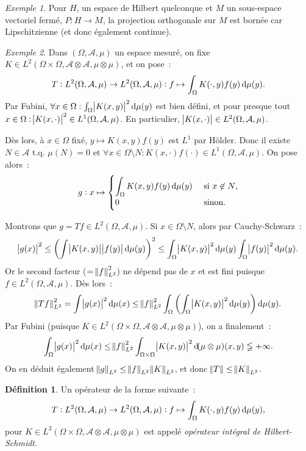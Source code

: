 \documentclass{report}
\newcommand{\tq}{\text{ t.q. }}
\newcommand{\st}{\tq}
\newcommand{\pinfty}{{+\infty}}
\theoremstyle{definition}
\newtheorem{déf}[thm]{Définition}
\theoremstyle{remark}
\newtheorem{ex}{Exemple}[chapter]
\begin{document}
\begin{ex}
Pour $H$, un espace de Hilbert quelconque et $M$ un sous-espace vectoriel fermé, $P : H \to M$, la projection orthogonale sur $M$ est bornée car Lipschitzienne
(et donc également continue).
\end{ex}

\begin{ex}
Dans $(\Omega, \mathcal A, \mu)$ un espace mesuré, on fixe $K \in L^2(\Omega \times \Omega, \mathcal A \otimes \mathcal A, \mu \otimes \mu)$, et on pose~:
\[T : L^2(\Omega, \mathcal A, \mu) \to L^2(\Omega, \mathcal A, \mu) : f \mapsto \int_\Omega K(\cdot, y)f(y)\dif\mu(y).\]
Par Fubini, $\forall x \in \Omega : \int_\Omega \abs {K(x, y)}^2\dif\mu(y)$ est bien défini, et pour presque tout $x \in \Omega :
\abs {K(x, \cdot)}^2 \in L^1(\Omega, \mathcal A, \mu)$. En particulier, $\abs {K(x, \cdot)} \in L^2(\Omega, \mathcal A, \mu)$.

Dès lors, à $x \in \Omega$ fixé, $y \mapsto K(x, y)f(y)$ est $L^1$ par Hölder. Donc il existe $N \in \mathcal A \st \mu(N) = 0$ et $\forall x \in \Omega \setminus N :
K(x, \cdot)f(\cdot) \in L^1(\Omega, \mathcal A, \mu)$. On pose alors~:
\[g : x \mapsto \begin{cases}\displaystyle \int_\Omega K(x, y)f(y)\dif\mu(y) &\text{ si $x \not \in N$,} \\0 &\text{ sinon.}\end{cases}\]

Montrons que $g = Tf \in L^2(\Omega, \mathcal A, \mu)$. Si $x \in \Omega \setminus N$, alors par Cauchy-Schwarz~:
\[\abs {g(x)}^2 \leq \left(\int\abs {K(x, y)}\abs {f(y)}\dif\mu(y)\right)^2 \leq \int_\Omega \abs {K(x, y)}^2\dif\mu(y)\int_\Omega \abs {f(y)}^2\dif\mu(y).\]
Or le second facteur ($= \norm f_{L^2}^2$) ne dépend pas de $x$ et est fini puisque $f \in L^2(\Omega, \mathcal A, \mu)$. Dès lors~:
\[\norm {Tf}_{L^2}^2 = \int\abs {g(x)}^2\dif\mu(x) \leq \norm f_{L^2}^2\int_\Omega\left(\int_\Omega \abs {K(x, y)}^2\dif\mu(y)\right)\dif\mu(y).\]
	Par Fubini (puisque $K \in L^2(\Omega \times \Omega, \mathcal A \otimes \mathcal A, \mu \otimes \mu)$), on a finalement~:
\[\int_\Omega\abs {g(x)}^2\dif\mu(x) \leq \norm f_{L^2}^2\int_{\Omega \times \Omega}\abs {K(x, y)}^2\dif(\mu \otimes \mu)(x, y) \lneqq \pinfty.\]
On en déduit également $\norm g_{L^2} \leq \norm f_{L^2}\norm K_{L^2}$, et donc $\norm T \leq \norm K_{L^2}$.
\end{ex}

\begin{déf} Un opérateur de la forme suivante~:
\[T : L^2(\Omega, \mathcal A, \mu) \to L^2(\Omega, \mathcal A, \mu) : f \mapsto \int_\Omega K(\cdot, y)f(y)\dif\mu(y),\]
pour $K \in L^2(\Omega \times \Omega, \mathcal A \otimes \mathcal A, \mu \otimes \mu)$ est appelé \textit{opérateur intégral de Hilbert-Schmidt}.
\end{déf}
\end{document}
